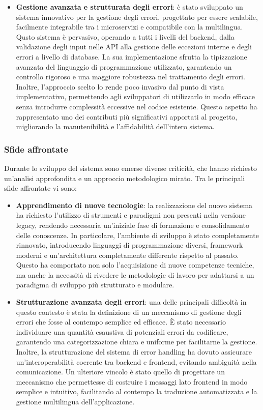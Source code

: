 \begin{itemize}
  \item \textbf{Gestione avanzata e strutturata degli errori}: è stato sviluppato un sistema innovativo per la gestione degli errori, progettato per essere scalabile, facilmente integrabile tra i microservizi e compatibile con la multilingua. Qusto sistema è pervasivo, operando a tutti i livelli del backend, dalla validazione degli input nelle API alla gestione delle eccezioni interne e degli errori a livello di database. La sua implementazione sfrutta la tipizzazione avanzata del linguaggio di programmazione utilizzato, garantendo un controllo rigoroso e una maggiore robustezza nel trattamento degli errori. Inoltre, l’approccio scelto lo rende poco invasivo dal punto di vista implementativo, permettendo agli sviluppatori di utilizzarlo in modo efficace senza introdurre complessità eccessive nel codice esistente. Questo aspetto ha rappresentato uno dei contributi più significativi apportati al progetto, migliorando la manutenibilità e l'affidabilità dell’intero sistema.
\end{itemize}

\subsubsection{Sfide affrontate}
Durante lo sviluppo del sistema sono emerse diverse criticità, che hanno richiesto un'analisi approfondita e un approccio metodologico mirato. Tra le principali sfide affrontate vi sono:

\begin{itemize}
  \item \textbf{Apprendimento di nuove tecnologie}: la realizzazione del nuovo sistema ha richiesto l’utilizzo di strumenti e paradigmi non presenti nella versione legacy, rendendo necessaria un'iniziale fase di formazione e consolidamento delle conoscenze. In particolare, l’ambiente di sviluppo è stato completamente rinnovato, introducendo linguaggi di programmazione diversi, framework moderni e un'architettura completamente differente rispetto al passato. Questo ha comportato non solo l'acquisizione di nuove competenze tecniche, ma anche la necessità di rivedere le metodologie di lavoro per adattarsi a un paradigma di sviluppo più strutturato e modulare.

  \item \textbf{Strutturazione avanzata degli errori}: una delle principali difficoltà in questo contesto è stata la definizione di un meccanismo di gestione degli errori che fosse al contempo semplice ed efficace. È stato necessario individuare una quantità esaustiva di potenziali errori da codificare, garantendo una categorizzazione chiara e uniforme per facilitarne la gestione. Inoltre, la strutturazione del sistema di error handling ha dovuto assicurare un'interoperabilità coerente tra backend e frontend, evitando ambiguità nella comunicazione. Un ulteriore vincolo è stato quello di progettare un meccanismo che permettesse di costruire i messaggi lato frontend in modo semplice e intuitivo, facilitando al contempo la traduzione automatizzata e la gestione multilingua dell’applicazione.
\end{itemize}

